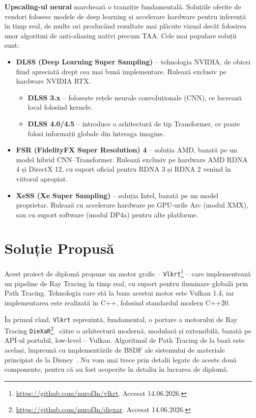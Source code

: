 \documentclass[12pt,a4paper]{report}
\numberwithin{equation}{section} %
\begin{document}
\textbf{Upscaling-ul neural} marchează o tranziție fundamentală.
Soluțiile oferite de vendori folosesc modele de deep learning și accelerare hardware pentru inferență în timp real, de multe ori producând rezultate mai plăcute vizual decât folosirea unor algoritmi de anti-aliasing nativi precum TAA.
Cele mai populare soluții sunt:
\begin{itemize}
	\item \textbf{DLSS (Deep Learning Super Sampling)} -- tehnologia NVIDIA, de obicei fiind apreciată drept cea mai bună implementare. Rulează exclusiv pe hardware NVIDIA RTX.
		\begin{itemize}
			\item \textbf{DLSS 3.x} -- folosește rețele neurale convoluționale (CNN), ce lucrează local folosind kernele.
			\item \textbf{DLSS 4.0/4.5} -- introduce o arhitectură de tip Transformer, ce poate folosi informații globale din întreaga imagine.
		\end{itemize}
	\item \textbf{FSR (FidelityFX Super Resolution) 4} -- soluția AMD, bazată pe un model hibrid CNN--Transformer. Rulează exclusiv pe hardware AMD RDNA 4 și DirectX 12, cu suport oficial pentru RDNA 3 și RDNA 2 venind în viitorul apropiat.
	\item \textbf{XeSS (Xe Super Sampling)} -- soluția Intel, bazată pe un model proprietar. Rulează cu accelerare hardware pe GPU-urile Arc (modul XMX), sau cu suport software (modul DP4a) pentru alte platforme.
\end{itemize}


\chapter{\label{sec:solutie}Soluție Propusă}

Acest proiect de diplomă propune un motor grafic -- \texttt{Vlkrt}\footnote{\url{https://github.com/nurof3n/vlkrt}. Accesat 14.06.2026.} -- care implementează un pipeline de Ray Tracing în timp real, cu suport pentru iluminare globală prin Path Tracing.
Tehnologia care stă la baza acestui motor este Vulkan 1.4, iar implementarea este realizată în C++, folosind standardul modern C++20.

În primul rând, \texttt{Vlkrt} reprezintă, fundamental, o portare a motorului de Ray Tracing \texttt{DieXaR}\footnote{\url{https://github.com/nurof3n/diexar}. Accesat 14.06.2026.}~\cite{DieXaR2024} către o arhitectură modernă, modulară și extensibilă, bazată pe API-ul portabil, low-level -- Vulkan.
Algoritmul de Path Tracing de la bază este același, împreună cu implementările de BSDF ale sistemului de materiale principiat de la Disney~\cite{Disney,DisneyBSDF}.
Nu vom mai trece prin detalii legate de aceste două componente, pentru că au fost acoperite în detaliu în lucrarea de diplomă.
\end{document}

